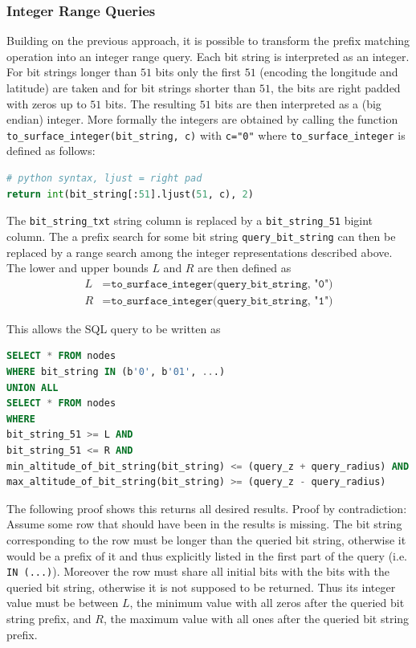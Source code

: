 \documentclass[10pt,conference,compsocconf]{IEEEtran}
\begin{document}
\subsubsection{Integer Range Queries}
Building on the previous approach, it is possible to transform the prefix matching operation into an integer range query.
Each bit string is interpreted as an integer.
For bit strings longer than $51$ bits only the first $51$ (encoding the longitude and latitude) are taken and for bit strings shorter than $51$, the bits are right padded with zeros up to $51$ bits.
The resulting $51$ bits are then interpreted as a (big endian) integer.
More formally the integers are obtained by calling the function \texttt{to\_surface\_integer(bit\_string, c)} with \texttt{c="0"} where \texttt{to\_surface\_integer} is defined as follows:
\begin{lstlisting}[language=Python]
# python syntax, ljust = right pad
return int(bit_string[:51].ljust(51, c), 2)
\end{lstlisting}
The \texttt{bit\_string\_txt} string column is replaced by a \texttt{bit\_string\_51} bigint column.
The a prefix search for some bit string \texttt{query\_bit\_string} can then be replaced by a range search among the integer representations described above.
The lower and upper bounds $L$ and $R$ are then defined as
\begin{align*}
	L &= \texttt{to\_surface\_integer(query\_bit\_string, "0")}\\
	R &= \texttt{to\_surface\_integer(query\_bit\_string, "1")}
\end{align*}

This allows the SQL query to be written as
\begin{lstlisting}[language=SQL]
SELECT * FROM nodes
WHERE bit_string IN (b'0', b'01', ...)
UNION ALL
SELECT * FROM nodes
WHERE
bit_string_51 >= L AND
bit_string_51 <= R AND
min_altitude_of_bit_string(bit_string) <= (query_z + query_radius) AND
max_altitude_of_bit_string(bit_string) >= (query_z - query_radius)
\end{lstlisting}

The following proof shows this returns all desired results.
Proof by contradiction:
Assume some row that should have been in the results is missing.
The bit string corresponding to the row must be longer than the queried bit string, otherwise it would be a prefix of it and thus explicitly listed in the first part of the query (i.e. \texttt{IN (...)}).
Moreover the row must share all initial bits with the bits with the queried bit string, otherwise it is not supposed to be returned.
Thus its integer value must be between $L$, the minimum value with all zeros after the queried bit string prefix, and $R$, the maximum value with all ones after the queried bit string prefix.
\end{document}
